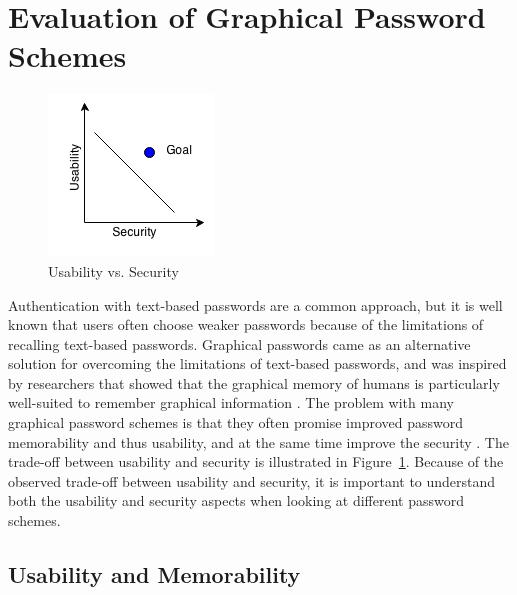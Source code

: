   \clearpage
 \section{Evaluation of Graphical Password Schemes} \label{sec:evaluation}

  \begin{figure}
    \vspace{-20pt}
    \begin{center}
      \includegraphics[scale=0.75]{pics/UsabilityVsSecurity.png}
    \end{center}
    \vspace{-20pt}
    \caption{Usability vs. Security}
    \vspace{-10pt}
    \label{fig:usabilitysecurity}
  \end{figure}

  Authentication with text-based passwords are a common approach, but it is well known that users often choose weaker passwords because of the limitations of recalling text-based passwords. Graphical passwords came as an alternative solution for overcoming the limitations of text-based passwords, and was inspired by researchers that showed that the graphical memory of humans is particularly well-suited to remember graphical information \cite{DeAngeli}. The problem with many graphical password schemes is that they often promise improved password memorability and thus usability, and at the same time improve the security \cite{Biddle}. The trade-off between usability and security is illustrated in Figure~\ref{fig:usabilitysecurity}. Because of the observed trade-off between usability and security, it is important to understand both the usability and security aspects when looking at different password schemes.

\subsection{Usability and Memorability} \label{sec:usability}



